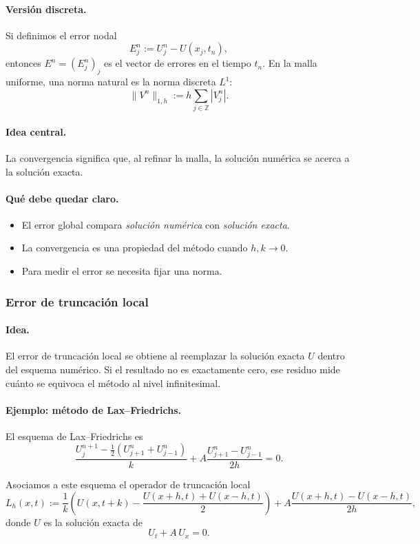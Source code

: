 \paragraph{Versión discreta.}
Si definimos el error nodal
\[
E_j^n := U_j^n-U(x_j,t_n),
\]
entonces \(E^n=(E_j^n)_j\) es el vector de errores en el tiempo \(t_n\). En la malla uniforme, una norma natural es la norma discreta \(L^1\):
\[
\|V^n\|_{1,h}:=h\sum_{j\in\mathbb{Z}} |V_j^n|.
\]

\paragraph{Idea central.}
La convergencia significa que, al refinar la malla, la solución numérica se acerca a la solución exacta.

\paragraph{Qué debe quedar claro.}
\begin{itemize}
    \item El error global compara \emph{solución numérica} con \emph{solución exacta}.
    \item La convergencia es una propiedad del método cuando \(h,k\to 0\).
    \item Para medir el error se necesita fijar una norma.
\end{itemize}

\subsubsection{Error de truncación local}

\paragraph{Idea.}
El error de truncación local se obtiene al reemplazar la solución exacta \(U\) dentro del esquema numérico. Si el resultado no es exactamente cero, ese residuo mide cuánto se equivoca el método al nivel infinitesimal.

\paragraph{Ejemplo: método de Lax--Friedrichs.}
El esquema de Lax--Friedrichs es
\[
\frac{U_j^{n+1}-\frac12\left(U_{j+1}^n+U_{j-1}^n\right)}{k}
+
A\frac{U_{j+1}^n-U_{j-1}^n}{2h}
=0.
\]

Asociamos a este esquema el operador de truncación local
\[
L_h(x,t):=
\frac{1}{k}\left(
U(x,t+k)-\frac{U(x+h,t)+U(x-h,t)}{2}
\right)
+
A\frac{U(x+h,t)-U(x-h,t)}{2h},
\]
donde \(U\) es la solución exacta de
\[
U_t+A\,U_x=0.
\]

